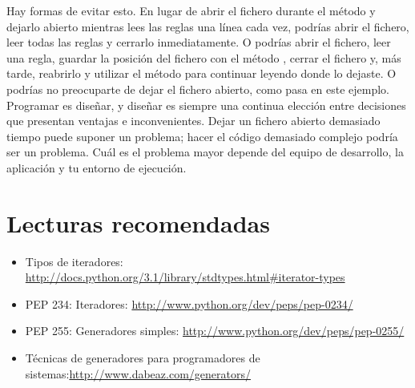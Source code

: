 Hay formas de evitar esto. En lugar de abrir el fichero durante el método  y dejarlo abierto mientras lees las reglas una línea cada vez, podrías abrir el fichero, leer todas las reglas y cerrarlo inmediatamente. O podrías abrir el fichero, leer una regla, guardar la posición del fichero con el método , cerrar el fichero y, más tarde, reabrirlo y utilizar el método  para continuar leyendo donde lo dejaste. O podrías no preocuparte de dejar el fichero abierto, como pasa en este ejemplo. Programar es diseñar, y diseñar es siempre una continua elección entre decisiones que presentan ventajas e inconvenientes. Dejar un fichero abierto demasiado tiempo puede suponer un problema; hacer el código demasiado complejo podría ser un problema. Cuál es el problema mayor depende del equipo de desarrollo, la aplicación y tu entorno de ejecución. 

\section{Lecturas recomendadas}

\begin{itemize}

\item Tipos de iteradores: \href{http://docs.python.org/3.1/library/stdtypes.html\#iterator-types}{http://docs.python.org/3.1/library/stdtypes.html\#iterator-types}

\item PEP 234: Iteradores: \href{http://www.python.org/dev/peps/pep-0234/}{http://www.python.org/dev/peps/pep-0234/}

\item PEP 255: Generadores simples: \href{http://www.python.org/dev/peps/pep-0255/}{http://www.python.org/dev/peps/pep-0255/}

\item Técnicas de generadores para programadores de sistemas:\newline \href{http://www.dabeaz.com/generators/}{http://www.dabeaz.com/generators/}

\end{itemize}

